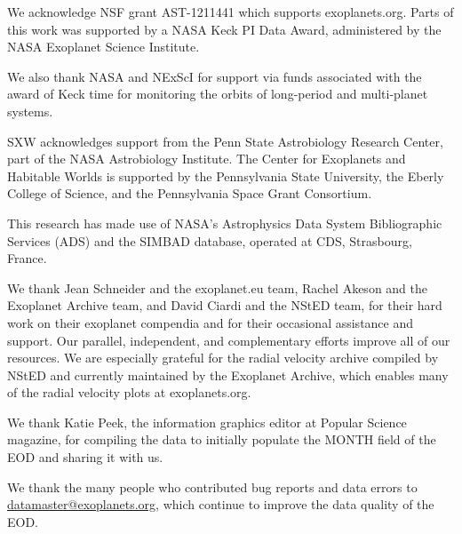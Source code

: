 \documentclass[11pt,preprint]{aastex}
\begin{document}
\begin{CJK*}{UTF8}{gbsn}
We acknowledge NSF grant AST-1211441 which supports exoplanets.org.
Parts of this work was supported by a NASA Keck PI Data Award, administered by
the NASA Exoplanet Science Institute.

We also thank NASA and NExScI for support via funds associated with
the award of Keck time for monitoring the orbits of long-period and
multi-planet systems.

SXW acknowledges support from the Penn State Astrobiology Research
Center, part of the NASA Astrobiology Institute. The Center for
Exoplanets and Habitable Worlds is supported by the 
Pennsylvania State University, the Eberly College of Science, and the
Pennsylvania Space Grant Consortium.

This research has made use of
NASA's Astrophysics Data System Bibliographic Services (ADS) and the SIMBAD database,
operated at CDS, Strasbourg, France. 

We thank Jean Schneider and the exoplanet.eu team, Rachel Akeson
and the Exoplanet Archive team, and David Ciardi and the NStED team,
for their hard work on their exoplanet compendia and for their
occasional assistance and support.  Our parallel,
independent, and complementary efforts improve all of our resources.
We are especially grateful for the radial velocity archive compiled by
NStED and currently maintained by the Exoplanet Archive, which enables
many of the radial velocity plots at exoplanets.org.

We thank Katie Peek, the information graphics editor at Popular
Science magazine, for compiling the data to initially populate the
MONTH field of the EOD and sharing it with us.

We thank the many people who contributed bug reports and data
errors to \url{datamaster@exoplanets.org}, which continue to improve
the data quality of the EOD.   






\clearpage


\end{CJK*}
\end{document}
